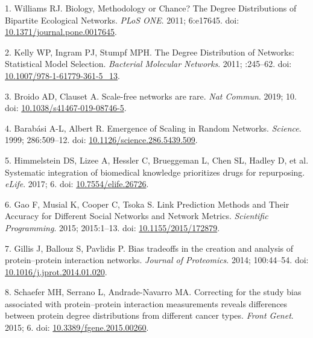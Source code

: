 \hypertarget{refs}{}
\begin{CSLReferences}{0}{0}
\leavevmode{}%
1. Williams RJ. Biology, Methodology or Chance? The Degree Distributions of Bipartite Ecological Networks. \emph{PLoS ONE}. 2011; 6:e17645. doi: \href{https://doi.org/10.1371/journal.pone.0017645}{10.1371/journal.pone.0017645}.

\leavevmode{}%
2. Kelly WP, Ingram PJ, Stumpf MPH. The Degree Distribution of Networks: Statistical Model Selection. \emph{Bacterial Molecular Networks}. 2011; :245--62. doi: \href{https://doi.org/10.1007/978-1-61779-361-5_13}{10.1007/978-1-61779-361-5\_13}.

\leavevmode{}%
3. Broido AD, Clauset A. Scale-free networks are rare. \emph{Nat Commun}. 2019; 10. doi: \href{https://doi.org/10.1038/s41467-019-08746-5}{10.1038/s41467-019-08746-5}.

\leavevmode{}%
4. Barabási A-L, Albert R. Emergence of Scaling in Random Networks. \emph{Science}. 1999; 286:509--12. doi: \href{https://doi.org/10.1126/science.286.5439.509}{10.1126/science.286.5439.509}.

\leavevmode{}%
5. Himmelstein DS, Lizee A, Hessler C, Brueggeman L, Chen SL, Hadley D, et al. Systematic integration of biomedical knowledge prioritizes drugs for repurposing. \emph{eLife}. 2017; 6. doi: \href{https://doi.org/10.7554/elife.26726}{10.7554/elife.26726}.

\leavevmode{}%
6. Gao F, Musial K, Cooper C, Tsoka S. Link Prediction Methods and Their Accuracy for Different Social Networks and Network Metrics. \emph{Scientific Programming}. 2015; 2015:1--13. doi: \href{https://doi.org/10.1155/2015/172879}{10.1155/2015/172879}.

\leavevmode{}%
7. Gillis J, Ballouz S, Pavlidis P. Bias tradeoffs in the creation and analysis of protein--protein interaction networks. \emph{Journal of Proteomics}. 2014; 100:44--54. doi: \href{https://doi.org/10.1016/j.jprot.2014.01.020}{10.1016/j.jprot.2014.01.020}.

\leavevmode{}%
8. Schaefer MH, Serrano L, Andrade-Navarro MA. Correcting for the study bias associated with protein--protein interaction measurements reveals differences between protein degree distributions from different cancer types. \emph{Front Genet}. 2015; 6. doi: \href{https://doi.org/10.3389/fgene.2015.00260}{10.3389/fgene.2015.00260}.


\end{CSLReferences}
